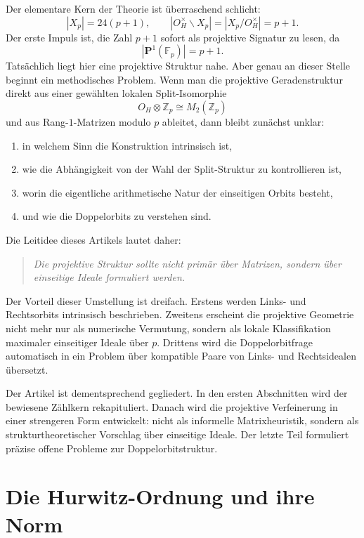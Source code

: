 \documentclass[12pt,a4paper]{article}
\theoremstyle{definition}
\newcommand{\OH}{O_H}
\newcommand{\Z}{\mathbb{Z}}
\begin{document}
	Der elementare Kern der Theorie ist überraschend schlicht:
	\[
	|X_p|=24(p+1),\qquad |\OH^\times\backslash X_p|=|X_p/\OH^\times|=p+1.
	\]
	Der erste Impuls ist, die Zahl \(p+1\) sofort als projektive Signatur zu lesen, da
	\[
	|\mathbf P^1(\mathbb F_p)|=p+1.
	\]
	Tatsächlich liegt hier eine projektive Struktur nahe. Aber genau an dieser Stelle beginnt ein methodisches Problem. Wenn man die projektive Geradenstruktur direkt aus einer gewählten lokalen Split-Isomorphie
	\[
	\OH\otimes \Z_p \cong M_2(\Z_p)
	\]
	und aus Rang-\(1\)-Matrizen modulo \(p\) ableitet, dann bleibt zunächst unklar:
	
	\begin{enumerate}[label=(\roman*)]
		\item in welchem Sinn die Konstruktion intrinsisch ist,
		\item wie die Abhängigkeit von der Wahl der Split-Struktur zu kontrollieren ist,
		\item worin die eigentliche arithmetische Natur der einseitigen Orbits besteht,
		\item und wie die Doppelorbits zu verstehen sind.
	\end{enumerate}
	
	Die Leitidee dieses Artikels lautet daher:
	
	\begin{quote}
		\emph{Die projektive Struktur sollte nicht primär über Matrizen, sondern über einseitige Ideale formuliert werden.}
	\end{quote}
	
	Der Vorteil dieser Umstellung ist dreifach. Erstens werden Links- und Rechtsorbits intrinsisch beschrieben. Zweitens erscheint die projektive Geometrie nicht mehr nur als numerische Vermutung, sondern als lokale Klassifikation maximaler einseitiger Ideale über \(p\). Drittens wird die Doppelorbitfrage automatisch in ein Problem über kompatible Paare von Links- und Rechtsidealen übersetzt.
	
	Der Artikel ist dementsprechend gegliedert. In den ersten Abschnitten wird der bewiesene Zählkern rekapituliert. Danach wird die projektive Verfeinerung in einer strengeren Form entwickelt: nicht als informelle Matrixheuristik, sondern als strukturtheoretischer Vorschlag über einseitige Ideale. Der letzte Teil formuliert präzise offene Probleme zur Doppelorbitstruktur.
	
	\section{Die Hurwitz-Ordnung und ihre Norm}
	
\end{document}
